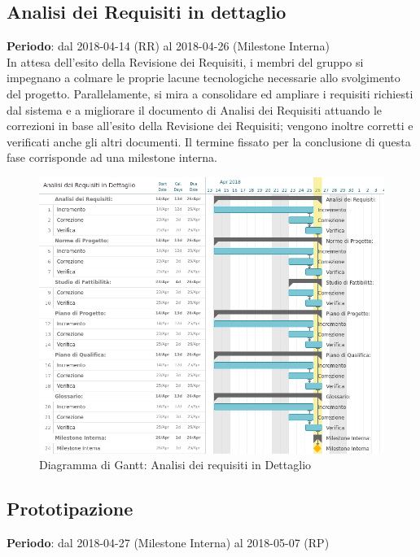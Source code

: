 \subsection{Analisi dei Requisiti in dettaglio}
\textbf{Periodo}: dal 2018-04-14 (RR) al 2018-04-26 (Milestone Interna)\\

In attesa dell'esito della Revisione dei Requisiti, i membri del gruppo si impegnano a colmare le proprie lacune tecnologiche necessarie allo svolgimento del progetto. Parallelamente, si mira a consolidare ed ampliare i requisiti richiesti dal sistema e a migliorare il documento di Analisi dei Requisiti attuando le correzioni in base all’esito della Revisione dei Requisiti; vengono inoltre corretti e verificati anche gli altri documenti. Il termine fissato per la conclusione di questa fase corrisponde ad una milestone interna.

\begin{figure}[h!]
	\centerline{\includegraphics[scale=0.5]{img/DiagrammiGantt/AnalisiRequisitiDettaglio.jpg}}
	\caption{Diagramma di Gantt: Analisi dei requisiti in Dettaglio}
	\label{fig:gantt_ana_req_dett}
\end{figure}
\clearpage

\subsection{Prototipazione}
\textbf{Periodo}: dal 2018-04-27 (Milestone Interna) al 2018-05-07 (RP)\\

